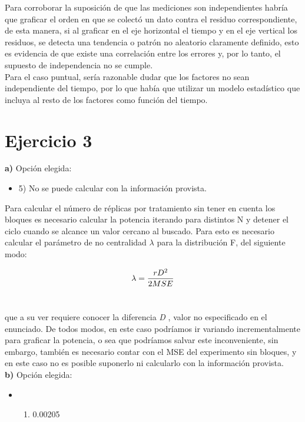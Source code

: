\documentclass[11pt]{article}
\providecommand{\tightlist}{%
      \setlength{\itemsep}{0pt}\setlength{\parskip}{0pt}}
\begin{document}
Para corroborar la suposición de que las mediciones son independientes
habría que graficar el orden en que se colectó un dato contra el residuo
correspondiente, de esta manera, si al graficar en el eje horizontal el
tiempo y en el eje vertical los residuos, se detecta una tendencia o
patrón no aleatorio claramente definido, esto es evidencia de que existe
una correlación entre los errores y, por lo tanto, el supuesto de
independencia no se cumple.\\

Para el caso puntual, sería razonable dudar que los factores no sean independiente del tiempo, por lo que había que utilizar un modelo estadístico que incluya al resto de los factores como función del tiempo.

\clearpage \newpage
{}
    \hypertarget{ejercicio-3}{%
\section*{Ejercicio 3}\label{ejercicio-3}}

    \textbf{a)} Opción elegida:

\begin{itemize}
\tightlist
\item
  5) No se puede calcular con la información provista. 
\end{itemize}

Para calcular el número de réplicas por tratamiento sin tener en cuenta
los bloques es necesario calcular la potencia iterando para distintos N y detener el ciclo cuando se alcance un valor cercano al buscado. Para esto es necesario calcular el parámetro de no centralidad \(\lambda\) para la distribución F, del siguiente modo:

\[\lambda = {{rD^2} \over {2MSE}} \]\

que a su ver requiere conocer la diferencia \emph{D} , valor no especificado en el enunciado. De todos modos, en este caso podríamos ir variando incrementalmente para graficar la potencia, o
sea que podríamos salvar este inconveniente, sin embargo, también es
necesario contar con el MSE del experimento sin bloques, y en este caso
no es posible suponerlo ni calcularlo con la información provista.\\

\textbf{b)} Opción elegida:

\begin{itemize}
\item
  \begin{enumerate}
  \def\labelenumi{\arabic{enumi})}
  \setcounter{enumi}{4}
  \tightlist
  \item
    0.00205
  \end{enumerate}
\end{itemize}
\end{document}
